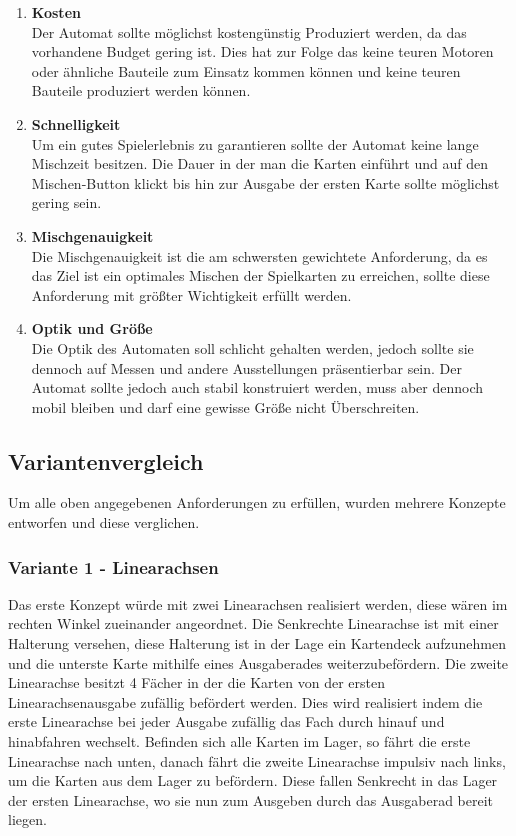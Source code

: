 \begin{enumerate}
    \item \textbf{Kosten}  \\
    Der Automat sollte möglichst kostengünstig Produziert werden,
    da das vorhandene Budget gering ist. Dies hat zur Folge das keine teuren Motoren
    oder ähnliche Bauteile zum Einsatz kommen können und  keine teuren Bauteile produziert
    werden können.
    \item \textbf{Schnelligkeit} \\
    Um ein gutes Spielerlebnis zu garantieren sollte der Automat keine
    lange Mischzeit besitzen. Die Dauer in der man die Karten einführt und auf den
    Mischen-Button klickt bis hin zur Ausgabe der ersten Karte sollte möglichst gering sein.
    \item \textbf{Mischgenauigkeit} \\
    Die Mischgenauigkeit ist die am schwersten gewichtete Anforderung,
    da es das Ziel ist ein optimales Mischen der Spielkarten zu erreichen, sollte
    diese Anforderung mit größter Wichtigkeit erfüllt werden.
    \item \textbf{Optik und Größe} \\
    Die Optik des Automaten soll schlicht gehalten werden, jedoch sollte
    sie dennoch auf Messen und andere Ausstellungen präsentierbar sein. Der Automat
    sollte jedoch auch stabil konstruiert werden, muss aber dennoch mobil bleiben und
    darf eine gewisse Größe nicht Überschreiten.
\end{enumerate}

\subsection{Variantenvergleich}
Um alle oben angegebenen Anforderungen zu erfüllen, wurden mehrere Konzepte entworfen und diese verglichen.

\subsubsection{Variante 1 - Linearachsen}

Das erste Konzept würde mit zwei Linearachsen realisiert werden, diese wären im rechten Winkel zueinander
angeordnet. Die Senkrechte Linearachse ist mit einer Halterung versehen, diese Halterung ist in der Lage
ein Kartendeck aufzunehmen und die unterste Karte mithilfe eines Ausgaberades weiterzubefördern. Die zweite
Linearachse besitzt 4 Fächer in der die Karten von der ersten Linearachsenausgabe zufällig befördert werden.
Dies wird realisiert indem die erste Linearachse bei jeder Ausgabe zufällig das Fach durch hinauf und
hinabfahren wechselt. Befinden sich alle Karten im Lager, so fährt die erste Linearachse nach unten, danach
fährt die zweite Linearachse impulsiv nach links, um die Karten aus dem Lager zu befördern. Diese fallen
Senkrecht in das Lager der ersten Linearachse, wo sie nun zum Ausgeben durch das Ausgaberad bereit liegen. \\

